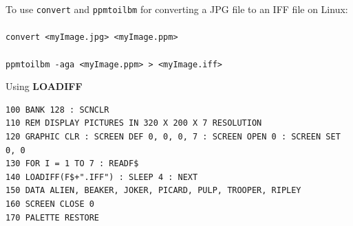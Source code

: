 \begin{description}[leftmargin=2cm,style=nextline]
                  To use \texttt{convert} and \texttt{ppmtoilbm} for converting a JPG file to an IFF file on Linux: \\
                  \\
                  \texttt{convert <myImage.jpg> <myImage.ppm>} \\
                  \\
                  \texttt{ppmtoilbm -aga <myImage.ppm> > <myImage.iff>}

\item [Example:]  Using {\bf LOADIFF}

\begin{tcolorbox}[colback=black,coltext=white]
\verbatimfont{\codefont}
\begin{verbatim}
100 BANK 128 : SCNCLR
110 REM DISPLAY PICTURES IN 320 X 200 X 7 RESOLUTION
120 GRAPHIC CLR : SCREEN DEF 0, 0, 0, 7 : SCREEN OPEN 0 : SCREEN SET 0, 0
130 FOR I = 1 TO 7 : READF$
140 LOADIFF(F$+".IFF") : SLEEP 4 : NEXT
150 DATA ALIEN, BEAKER, JOKER, PICARD, PULP, TROOPER, RIPLEY
160 SCREEN CLOSE 0
170 PALETTE RESTORE
\end{verbatim}
\end{tcolorbox}
\end{description}


\newpage
